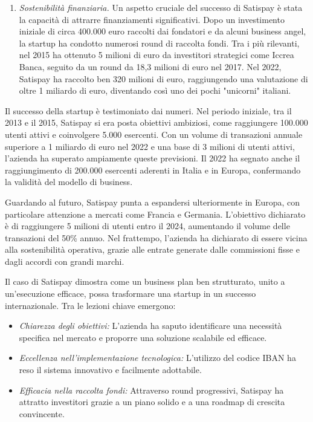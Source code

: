 \begin{enumerate}
    \item \textit{Sostenibilità finanziaria.} Un aspetto cruciale del successo di Satispay è stata la capacità di attrarre finanziamenti significativi. Dopo un investimento iniziale di circa 400.000 euro raccolti dai fondatori e da alcuni business angel, la startup ha condotto numerosi round di raccolta fondi. Tra i più rilevanti, nel 2015 ha ottenuto 5 milioni di euro da investitori strategici come Iccrea Banca, seguito da un round da 18,3 milioni di euro nel 2017. Nel 2022, Satispay ha raccolto ben 320 milioni di euro, raggiungendo una valutazione di oltre 1 miliardo di euro, diventando così uno dei pochi "unicorni" italiani.
\end{enumerate}
Il successo della startup è testimoniato dai numeri. Nel periodo iniziale, tra il 2013 e il 2015, Satispay si era posta obiettivi ambiziosi, come raggiungere 100.000 utenti attivi e coinvolgere 5.000 esercenti. Con un volume di transazioni annuale superiore a 1 miliardo di euro nel 2022 e una base di 3 milioni di utenti attivi, l’azienda ha superato ampiamente queste previsioni. Il 2022 ha segnato anche il raggiungimento di 200.000 esercenti aderenti in Italia e in Europa, confermando la validità del modello di business.

Guardando al futuro, Satispay punta a espandersi ulteriormente in Europa, con particolare attenzione a mercati come Francia e Germania. L’obiettivo dichiarato è di raggiungere 5 milioni di utenti entro il 2024, aumentando il volume delle transazioni del 50\% annuo. Nel frattempo, l’azienda ha dichiarato di essere vicina alla sostenibilità operativa, grazie alle entrate generate dalle commissioni fisse e dagli accordi con grandi marchi.

Il caso di Satispay dimostra come un business plan ben strutturato, unito a un’esecuzione efficace, possa trasformare una startup in un successo internazionale. Tra le lezioni chiave emergono:
\begin{itemize}
    \item \textit{Chiarezza degli obiettivi:} L’azienda ha saputo identificare una necessità specifica nel mercato e proporre una soluzione scalabile ed efficace.
    \item \textit{Eccellenza nell'implementazione tecnologica:} L'utilizzo del codice IBAN ha reso il sistema innovativo e facilmente adottabile.
    \item \textit{Efficacia nella raccolta fondi:} Attraverso round progressivi, Satispay ha attratto investitori grazie a un piano solido e a una roadmap di crescita convincente.
\end{itemize}
